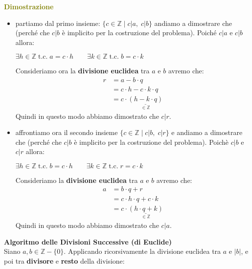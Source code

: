 \begin{boxA}
    \textcolor{olive}{\textbf{Dimostrazione}}
    \begin{itemize}[nosep]
        \item partiamo dal primo insieme: $\{c \in \mathbb{Z} \; \vert \; c | a, \; c | b \}$ andiamo a dimostrare che  (perché che $c|b$ è implicito per la costruzione del problema). Poiché $c|a$ e $c|b$ allora:
        
        {\centering
            $\exists h \in \mathbb{Z} \; \text{t.c.} \; a = c \cdot h \qquad \exists k \in \mathbb{Z} \; \text{t.c.} \; b = c \cdot k$
        \par}

        Consideriamo ora la \textbf{divisione euclidea} tra $a$ e $b$ avremo che:
        \begin{align*}
            r &= a - b \cdot q \\
            &= c \cdot h - c \cdot k \cdot q \\
            & = c \cdot \underset{\in \mathbb{Z}}{\underline{(h - k \cdot q)}}
        \end{align*}
        Quindi in questo modo abbiamo dimostrato che $c|r$.
        \item affrontiamo ora il secondo insieme $\{c \in \mathbb{Z} \; | \; c | b, \; c | r \}$ e andiamo a dimostrare che  (perché che $c|b$ è implicito per la costruzione del problema). Poichè $c|b$ e $c|r$ allora:

        {\centering
            $\exists h \in \mathbb{Z} \; \text{t.c.} \; b = c \cdot h \qquad \exists k \in \mathbb{Z} \; \text{t.c.} \; r = c \cdot k$
        \par}

        Consideriamo la \textbf{divisione euclidea} tra $a$ e $b$ avremo che:
        \begin{align*}
            a &= b \cdot q + r \\
            &= c \cdot h \cdot q + c \cdot k \\
            &= c \cdot \underset{\in \mathbb{Z}}{\underline{(h \cdot q + k)}}
        \end{align*} 
        Quindi in questo modo abbiamo dimostrato che $c|a$.
    \end{itemize}
\end{boxA}

\newpage
\textbf{Algoritmo delle Divisioni Successive (di Euclide)} \\
Siano $a, b \in \mathbb{Z} - \{0\}$. Applicando ricorsivamente la divisione euclidea tra $a$ e $|b|$, e poi tra \textbf{divisore} e \textbf{resto} della divisione:

